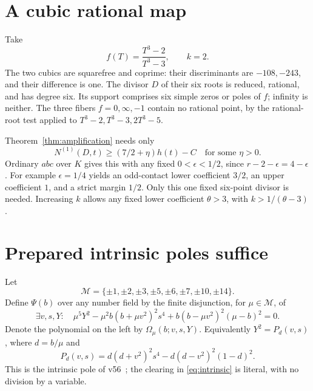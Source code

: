\documentclass[11pt,a4paper]{article}
\begin{document}
\section{A cubic rational map}

Take
\begin{equation}\label{eq:cubic}
              f(T)=\frac{T^3-2}{T^3-3},\qquad k=2.
\end{equation}
The two cubics are squarefree and coprime: their discriminants are
$-108,-243$, and their difference is one. The divisor $D$ of their
six roots is reduced, rational, and has degree six. Its support comprises
six simple zeros or poles of $f$; infinity is neither. The three fibers
$f=0,\infty,-1$ contain no rational point, by the rational-root test
applied to $T^3-2,T^3-3,2T^3-5$.

Theorem~\ref{thm:amplification} needs only
\[
                  N^{(1)}(D,t)\ge(7/2+\eta)h(t)-C
                  \quad\text{for some }\eta>0.
\]
Ordinary $abc$ over $K$ gives this with any fixed
$0<\epsilon<1/2$, since $r-2-\epsilon=4-\epsilon$.
For example $\epsilon=1/4$ yields an odd-contact lower coefficient
$3/2$, an upper coefficient $1$, and a strict margin $1/2$.
Only this one fixed six-point divisor is needed. Increasing $k$ allows
any fixed lower coefficient $\theta>3$, with $k>1/(\theta-3)$.

\section{Prepared intrinsic poles suffice}

Let
\[
 \mathcal M=\{\pm1,\pm2,\pm3,\pm5,\pm6,\pm7,\pm10,\pm14\}.
\]
Define $\Psi(b)$ over any number field by the finite disjunction, for
$\mu\in\mathcal M$, of
\begin{equation}\label{eq:intrinsic}
 \exists v,s,Y:\quad
 \mu^5Y^2-\mu^2b(b+\mu v^2)^2s^4
                    +b(b-\mu v^2)^2(\mu-b)^2=0.
\end{equation}
Denote the polynomial on the left by $\Omega_\mu(b;v,s,Y)$.
Equivalently $Y^2=P_d(v,s)$, where $d=b/\mu$ and
\[
 P_d(v,s)=d(d+v^2)^2s^4-d(d-v^2)^2(1-d)^2.
\]
This is the intrinsic pole of v56~\cite{v56}; the clearing in
\eqref{eq:intrinsic} is literal, with no division by a variable.
\end{document}
